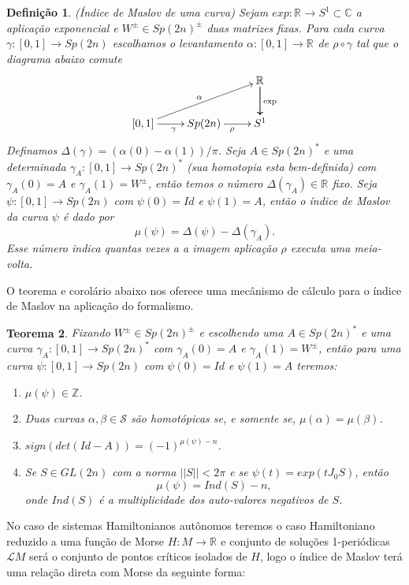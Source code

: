 \documentclass[12pt]{book}
\newtheorem{teorema}{Teorema}[section]
\newtheorem{definicao}[teorema]{Definição}
\newcommand{\real}[1]{\mathbb{R}^{#1}}
\newcommand{\solucoesperiodicascontrateis}{\mathcal{L}M}
\begin{document}
	\begin{definicao}
		(Índice de Maslov de uma curva) Sejam $exp:\real{} \to S^{1} \subset \mathbb{C}$ a aplicação exponencial e $W^{\pm} \in Sp(2n)^{\pm}$ duas matrizes fixas. Para cada curva $\gamma:[0,1] \to Sp(2n)$ escolhamos o levantamento $\alpha:[0,1] \to \real{}$ de $\rho\circ \gamma$ tal que o diagrama abaixo comute
		$$
		\xymatrix{
			& & \real{}\ar[d]\ar[d]^{\text{exp}}
			\\
			[0,1 ]\ar[urr]^{\alpha} \ar[r]_{\gamma} & Sp(2n) \ar[r]_{\rho} & S^{1}
		}
		$$	
		Definamos $\varDelta(\gamma) = (\alpha(0) - \alpha(1))/\pi$. Seja $A \in Sp(2n)^{*}$ e uma determinada $\gamma_{A}:[0,1] \to Sp(2n)^{*}$ (sua homotopia esta bem-definida) com $\gamma_{A}(0) = A$ e $\gamma_{A}(1) = W^{\pm}$, então temos o número $\varDelta(\gamma_{A}) \in \real{}$ fixo.
		Seja $\psi:[0,1] \to Sp(2n)$ com $\psi(0)=Id$ e $\psi(1)=A$, então o índice de Maslov da curva $\psi$ é dado por
		$$
		\mu(\psi) = \varDelta(\psi) - \varDelta(\gamma_{A}).
		$$
		Esse número indica quantas vezes a a imagem aplicação $\rho$ executa uma meia-volta.
	\end{definicao}
	
	O teorema e corolário abaixo nos oferece uma mecânismo de cálculo para o índice de Maslov na aplicação do formalismo.
	
	\begin{teorema}
		Fixando $W^{\pm} \in Sp(2n)^{\pm}$ e escolhendo uma $A \in Sp(2n)^{*}$ e uma curva $\gamma_{A}:[0,1] \to Sp(2n)^{*}$ com $\gamma_{A}(0) = A$ e $\gamma_{A}(1) = W^{\pm}$, então para uma curva  $\psi:[0,1] \to Sp(2n)$ com $\psi(0) = Id$ e $\psi(1) = A$ teremos:
		\begin{enumerate}
			\item $\mu(\psi) \in \mathbb{Z}$.
			\item Duas curvas $\alpha, \beta \in \mathcal{S}$ são homotópicas se, e somente se, $\mu(\alpha) = \mu(\beta)$.
			\item $sign(det(Id - A)) = (-1)^{\mu(\psi)-n}$.
			\item Se $S \in GL(2n)$ com a norma $||S|| < 2\pi$ e se $\psi(t) = exp(tJ_{0}S)$, então 
			$$
			\mu(\psi) = Ind(S) - n,
			$$
			onde $Ind(S)$ é a multiplicidade dos auto-valores negativos de $S$.
		\end{enumerate}
	\end{teorema}
	
	No caso de sistemas Hamiltonianos autônomos teremos o caso Hamiltoniano reduzido a uma função de Morse $H:M\to \real{}$ e conjunto de soluções 1-periódicas $\solucoesperiodicascontrateis$ será o conjunto de pontos críticos isolados de $H$, logo o índice de Maslov terá uma relação direta com Morse da seguinte forma:
	
\end{document}
